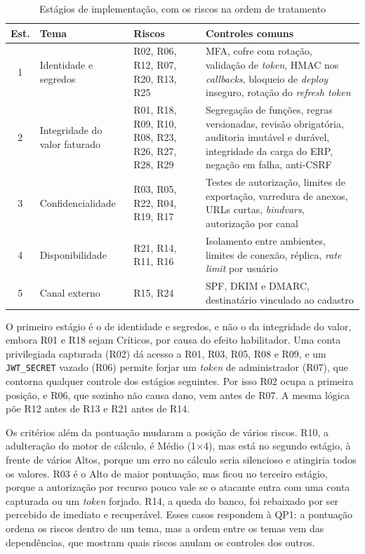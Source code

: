 \documentclass[conference]{IEEEtran}
\begin{document}
\begin{table}[!t]
\centering
\caption{Estágios de implementação, com os riscos na ordem de tratamento}
\label{tab:estagios}
\footnotesize
\renewcommand{\arraystretch}{1.15}
\begin{tabularx}{\columnwidth}{@{}c >{\raggedright\arraybackslash}p{1.7cm} >{\raggedright\arraybackslash}p{2.1cm} Y@{}}
\hline
\textbf{Est.} & \textbf{Tema} & \textbf{Riscos} & \textbf{Controles comuns} \\
 & Identidade e segredos & R02, R06, R12, R07, R20, R13, R25 & MFA, cofre com rotação, validação de \textit{token}, HMAC nos \textit{callbacks}, bloqueio de \textit{deploy} inseguro, rotação do \textit{refresh token} \\
2 & Integridade do valor faturado & R01, R18, R09, R10, R08, R23, R26, R27, R28, R29 & Segregação de funções, regras versionadas, revisão obrigatória, auditoria imutável e durável, integridade da carga do ERP, negação em falha, anti-CSRF \\
3 & Confidencia\-lidade & R03, R05, R22, R04, R19, R17 & Testes de autorização, limites de exportação, varredura de anexos, URLs curtas, \textit{bindvars}, autorização por canal \\
4 & Disponibili\-dade & R21, R14, R11, R16 & Isolamento entre ambientes, limites de conexão, réplica, \textit{rate limit} por usuário \\
5 & Canal externo & R15, R24 & SPF, DKIM e DMARC, destinatário vinculado ao cadastro \\
\hline
\end{tabularx}
\end{table}

O primeiro estágio é o de identidade e segredos, e não o da integridade do valor, embora R01 e R18 sejam Críticos, por causa do efeito habilitador. Uma conta privilegiada capturada (R02) dá acesso a R01, R03, R05, R08 e R09, e um \texttt{JWT\_SECRET} vazado (R06) permite forjar um \textit{token} de administrador (R07), que contorna qualquer controle dos estágios seguintes. Por isso R02 ocupa a primeira posição, e R06, que sozinho não causa dano, vem antes de R07. A mesma lógica põe R12 antes de R13 e R21 antes de R14.

Os critérios além da pontuação mudaram a posição de vários riscos. R10, a adulteração do motor de cálculo, é Médio (1$\times$4), mas está no segundo estágio, à frente de vários Altos, porque um erro no cálculo seria silencioso e atingiria todos os valores. R03 é o Alto de maior pontuação, mas ficou no terceiro estágio, porque a autorização por recurso pouco vale se o atacante entra com uma conta capturada ou um \textit{token} forjado. R14, a queda do banco, foi rebaixado por ser percebido de imediato e recuperável. Esses casos respondem à QP1: a pontuação ordena os riscos dentro de um tema, mas a ordem entre os temas vem das dependências, que mostram quais riscos anulam os controles dos outros.
\end{document}
